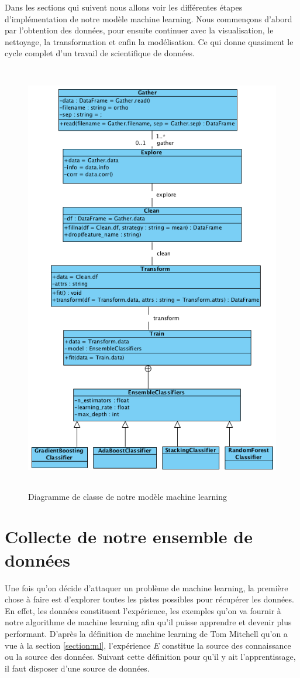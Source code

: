 \documentclass[12pt, french]{report}
\begin{document}
Dans les sections qui suivent nous allons voir les différentes étapes d'implémentation de notre modèle machine learning. Nous commençons d'abord par l'obtention des données, pour ensuite continuer avec la visualisation, le nettoyage, la transformation et enfin la modélisation. Ce qui donne quasiment le cycle complet d'un travail de scientifique de données.

\begin{figure}[p]
\includegraphics[width=13cm, height=19cm]{images/MLClassDiag.png}
\caption{Diagramme de classe de notre modèle machine learning}
\label{MLClassDiag}
\end{figure}
\newpage


\section{Collecte de notre ensemble de données}
Une fois qu'on décide d'attaquer un problème de machine learning, la première chose à faire est d'explorer toutes les pistes possibles pour récupérer les données. En effet, les données constituent l'expérience, les exemples qu'on va fournir à notre algorithme de machine learning afin qu'il puisse apprendre et devenir plus performant. D'après la définition de machine learning de Tom Mitchell qu'on a vue à la section \ref{section:ml}, l'expérience $E$ constitue la source des connaissance ou la source des données. Suivant cette définition pour qu'il y ait l'apprentissage, il faut disposer d'une source de données.\\   
\end{document}
